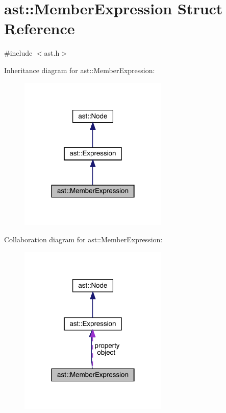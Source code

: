 \hypertarget{structast_1_1_member_expression}{}\section{ast\+:\+:Member\+Expression Struct Reference}
\label{structast_1_1_member_expression}


{\ttfamily \#include $<$ast.\+h$>$}



Inheritance diagram for ast\+:\+:Member\+Expression\+:
\nopagebreak
\begin{figure}[H]
\begin{center}
\leavevmode
\includegraphics[width=201pt]{structast_1_1_member_expression__inherit__graph}
\end{center}
\end{figure}


Collaboration diagram for ast\+:\+:Member\+Expression\+:
\nopagebreak
\begin{figure}[H]
\begin{center}
\leavevmode
\includegraphics[width=201pt]{structast_1_1_member_expression__coll__graph}
\end{center}
\end{figure}
